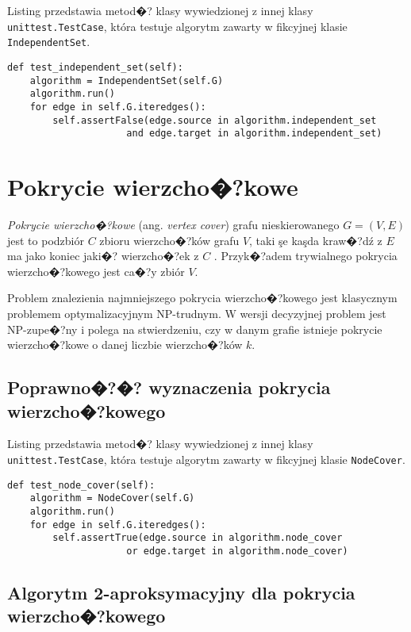 \documentclass[12pt,a4paper]{mwrep}
\begin{document}
Listing przedstawia metod�? klasy wywiedzionej z innej klasy
\lstinline|unittest.TestCase|, która testuje algorytm
zawarty w fikcyjnej klasie \lstinline|IndependentSet|.

\begin{lstlisting}[caption={Test poprawno�?ci zbioru niezaleşnego.},
label={lst:proper_independent_set}]
def test_independent_set(self):
    algorithm = IndependentSet(self.G)
    algorithm.run()
    for edge in self.G.iteredges():
        self.assertFalse(edge.source in algorithm.independent_set
                     and edge.target in algorithm.independent_set)
\end{lstlisting}

\section{Pokrycie wierzcho�?kowe}
\label{sec:vertex_cover}

\emph{Pokrycie wierzcho�?kowe} (ang. \emph{vertex cover})
grafu nieskierowanego $G=(V,E)$ jest to podzbiór $C$ zbioru
wierzcho�?ków grafu $V$, taki şe kaşda kraw�?dź z $E$ ma jako
koniec jaki�? wierzcho�?ek z $C$
\cite{wiki_vertex_cover}.
Przyk�?adem trywialnego pokrycia wierzcho�?kowego jest 
ca�?y zbiór $V$.

Problem znalezienia najmniejszego pokrycia wierzcho�?kowego
jest klasycznym problemem optymalizacyjnym NP-trudnym.
W wersji decyzyjnej problem jest NP-zupe�?ny i polega na stwierdzeniu,
czy w danym grafie istnieje pokrycie wierzcho�?kowe o danej
liczbie wierzcho�?ków $k$.

\subsection{Poprawno�?�? wyznaczenia pokrycia wierzcho�?kowego}

Listing przedstawia metod�? klasy wywiedzionej z innej klasy
\lstinline|unittest.TestCase|, która testuje algorytm
zawarty w fikcyjnej klasie \lstinline|NodeCover|.

\begin{lstlisting}[caption={Test poprawno�?ci pokrycia wierzcho�?kowego.},
label={lst:proper_node_cover}]
def test_node_cover(self):
    algorithm = NodeCover(self.G)
    algorithm.run()
    for edge in self.G.iteredges():
        self.assertTrue(edge.source in algorithm.node_cover
                     or edge.target in algorithm.node_cover)
\end{lstlisting}

\subsection{Algorytm 2-aproksymacyjny dla pokrycia wierzcho�?kowego}
\end{document}
